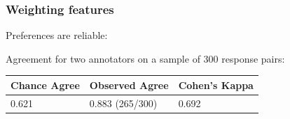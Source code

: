 \documentclass[handout,xcolor={dvipsnames}]{beamer}
\begin{document}
\begin{frame}
\frametitle{Weighting features}

\vspace{1em}

Preferences are reliable:

\vspace{1em}

Agreement for two annotators on a sample of 300 response pairs:

\vspace{1em}

\begin{table}[htb!]
\begin{center}
\begin{tabular}{|l|l|l|}
\hline
 Chance Agree & Observed Agree & Cohen's Kappa \\
\hline
0.621 & 0.883 (265/300) & 0.692 \\
\hline
\end{tabular}
\end{center}
\end{table}

\end{frame}
\end{document}
